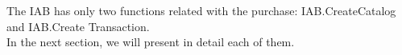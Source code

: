 The IAB has only two functions related with the purchase: \textsf{IAB.CreateCatalog} and \textsf{IAB.Create Transaction}. \\

In the next section, we will present in detail each of them.






%


